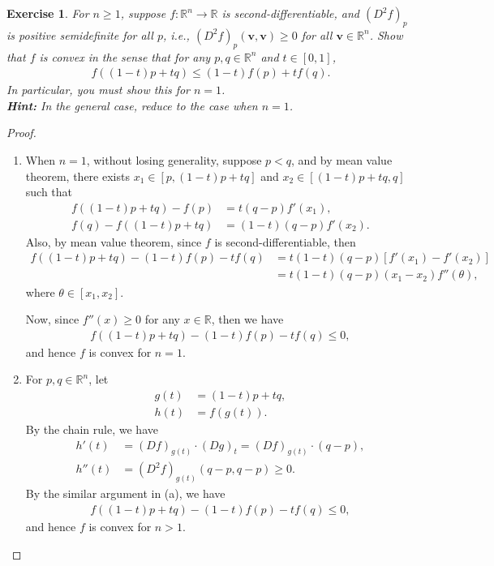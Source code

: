 \documentclass[11pt]{article}
\newtheorem{exercise}{Exercise}[section]
\theoremstyle{definition}
\numberwithin{equation}{subsection}
\begin{document}
\begin{exercise}
For $n \geq 1$, suppose $f:\mathbb{R}^n \to \mathbb{R}$ is second-differentiable, and $\left(D^2f\right)_p$  is positive semidefinite for all $p$, i.e., $\left(D^2f\right)_p(\mathbf{v}, \mathbf{v}) \geq 0$ for all $\mathbf{v} \in \mathbb{R}^n$. Show that $f$ is convex in the sense that for any $p, q \in \mathbb{R}^n$ and $t \in [0,1]$,
\begin{align*}
    f((1-t)p + tq) \leq (1 - t)f(p) + tf(q).
\end{align*}
In particular, you must show this for $n = 1$. \\
{\bf Hint:} In the general case, reduce to the case when $n = 1$.
\end{exercise}
\begin{proof}
~\begin{enumerate}[label=(\alph*)]
    \item When $n = 1$, without losing generality, suppose $p < q$, and by mean value theorem, there exists $x_1 \in [p, (1-t)p + tq]$ and $x_2 \in [(1-t)p + tq, q]$ such that 
    \begin{align*}
        f((1-t)p + tq) - f(p) & = t(q - p) f'(x_1), \\
        f(q) - f((1-t)p + tq) & = (1 - t)(q - p) f'(x_2).
    \end{align*}
    Also, by mean value theorem, since $f$ is second-differentiable, then
    \begin{align*}
        f((1-t)p + tq) - (1 - t)f(p) - tf(q) & = t(1 - t)(q - p)\left[f'(x_1) - f'(x_2) \right] \\
        & = t(1 - t)(q - p)(x_1 - x_2) f''(\theta),
    \end{align*}
    where $\theta \in [x_1, x_2]$. 
    
    Now, since $f''(x) \geq 0$ for any $x \in \mathbb{R}$, then we have 
    \begin{align*}
        f((1-t)p + tq) - (1 - t)f(p) - tf(q) \leq 0,
    \end{align*}
    and hence $f$ is convex for $n = 1$.
    
    \item For $p, q \in \mathbb{R}^n$, let 
    \begin{align*}
        g(t) & = (1-t)p + tq,\\
        h(t) & = f(g(t)).
    \end{align*}
    By the chain rule, we have
    \begin{align*}
        h'(t) & = (Df)_{g(t)}\cdot (Dg)_t = (Df)_{g(t)}\cdot (q - p), \\
        h''(t) & = \left(D^2f\right)_{g(t)}(q - p, q - p) \geq 0.
    \end{align*}
    By the similar argument in (a), we have
    \begin{align*}
        f((1-t)p + tq) - (1 - t)f(p) - tf(q) \leq 0,
    \end{align*}
    and hence $f$ is convex for $n > 1$.
\end{enumerate}
\end{proof}
\end{document}
